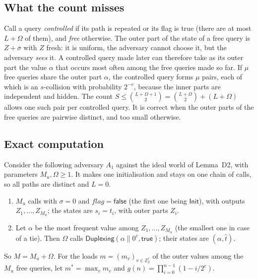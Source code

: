 \documentclass[11pt,a4paper]{article}
\theoremstyle{definition}
\theoremstyle{remark}
\newcommand{\flag}{\mathit{flag}}
\newcommand{\true}{\mathsf{true}}
\newcommand{\false}{\mathsf{false}}
\newcommand{\Z}{\mathbb{Z}}
\newcommand{\outp}[1]{\overline{#1}}
\newcommand{\inp}[1]{\widehat{#1}}
\begin{document}
\subsection{What the count misses}
Call a query \emph{controlled} if its path is repeated or its flag is true (there are at most $L + \Omega$ of them),
and \emph{free} otherwise. The outer part of the state of a free query is $Z + \outp{\sigma}$ with $Z$ fresh: it is
uniform, the adversary cannot choose it, but the adversary \emph{sees} it. A controlled query made later can therefore
take as its outer part the value $\alpha$ that occurs most often among the free queries made so far. If $\mu$ free
queries share the outer part $\alpha$, the controlled query forms $\mu$ pairs, each of which is an $s$-collision with
probability $2^{-c}$, because the inner parts are independent and hidden. The count
$S \le \binom{L+\Omega+1}{2} = \binom{L+\Omega}{2} + (L+\Omega)$ allows one such pair per controlled query. It is correct
when the outer parts of the free queries are pairwise distinct, and too small otherwise.

\subsection{Exact computation}
Consider the following adversary $A_1$ against the ideal world of Lemma~D2, with parameters $M_u, \Omega \ge 1$.
It makes one initialisation and stays on one chain of calls, so all paths are distinct and $L = 0$.
\begin{enumerate}[leftmargin=*,itemsep=1pt]
\item $M_u$ calls with $\sigma = 0$ and $\flag = \false$ (the first one being $\mathsf{Init}$), with outputs $Z_1, \dots, Z_{M_u}$;
the states are $s_i = t_i$, with outer parts $Z_i$.
\item Let $\alpha$ be the most frequent value among $Z_1, \dots, Z_{M_u}$ (the smallest one in case of a tie). Then $\Omega$ calls
$\mathsf{Duplexing}(\alpha \| 0^c, \true)$; their states are $(\alpha, \inp{t})$.
\end{enumerate}
So $M = M_u + \Omega$. For the loads $m = (m_v)_{v \in \Z_2^r}$ of the outer values among the $M_u$ free queries, let
$m^* = \max_v m_v$ and $g(n) = \prod_{i=0}^{n-1}(1 - i/2^c)$.
\end{document}

